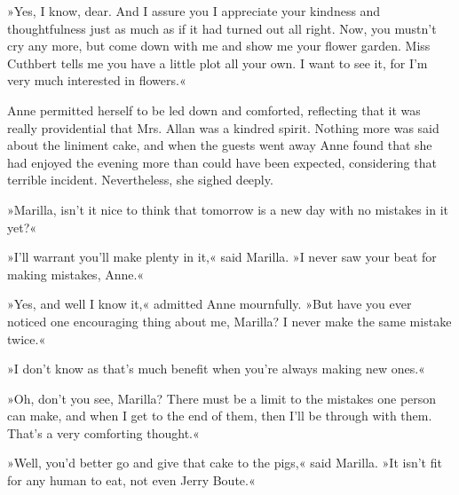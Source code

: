 »Yes, I know, dear. And I assure you I appreciate your kindness and thoughtfulness just as much as if it had turned out all right. Now, you mustn't cry any more, but come down with me and show me your flower garden. Miss Cuthbert tells me you have a little plot all your own. I want to see it, for I'm very much interested in flowers.«

Anne permitted herself to be led down and comforted, reflecting that it was really providential that Mrs. Allan was a kindred spirit. Nothing more was said about the liniment cake, and when the guests went away Anne found that she had enjoyed the evening more than could have been expected, considering that terrible incident. Nevertheless, she sighed deeply.

»Marilla, isn't it nice to think that tomorrow is a new day with no mistakes in it yet?«

»I'll warrant you'll make plenty in it,« said Marilla. »I never saw your beat for making mistakes, Anne.«

»Yes, and well I know it,« admitted Anne mournfully. »But have you ever noticed one encouraging thing about me, Marilla? I never make the same mistake twice.«

»I don't know as that's much benefit when you're always making new ones.«

»Oh, don't you see, Marilla? There must be a limit to the mistakes one person can make, and when I get to the end of them, then I'll be through with them. That's a very comforting thought.«

»Well, you'd better go and give that cake to the pigs,« said Marilla. »It isn't fit for any human to eat, not even Jerry Boute.«